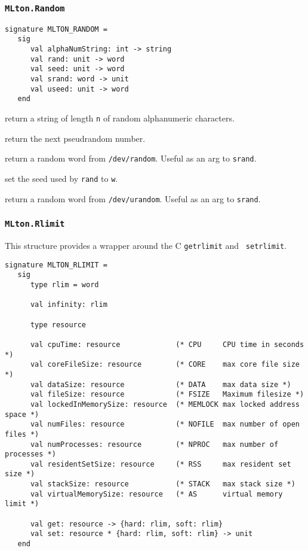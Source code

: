 \subsubsection{\tt MLton.Random}
\begin{verbatim}
signature MLTON_RANDOM =
   sig
      val alphaNumString: int -> string
      val rand: unit -> word
      val seed: unit -> word
      val srand: word -> unit
      val useed: unit -> word
   end
\end{verbatim}

\begin{description}
return a string of length {\tt n} of random alphanumeric characters.

return the next pseudrandom number.

return a random word from {\tt /dev/random}.  Useful as an arg to {\tt srand}.

set the seed used by {\tt rand} to {\tt w}.

return a random word from {\tt /dev/urandom}.  Useful as an arg to {\tt srand}.
\end{description}

\subsubsection{\tt MLton.Rlimit}
This structure provides a wrapper around the C {\tt getrlimit} and {\tt
setrlimit}.
\begin{verbatim}
signature MLTON_RLIMIT =
   sig
      type rlim = word
               
      val infinity: rlim

      type resource
               
      val cpuTime: resource             (* CPU     CPU time in seconds *)
      val coreFileSize: resource        (* CORE    max core file size *)
      val dataSize: resource            (* DATA    max data size *)
      val fileSize: resource            (* FSIZE   Maximum filesize *)
      val lockedInMemorySize: resource  (* MEMLOCK max locked address space *)
      val numFiles: resource            (* NOFILE  max number of open files *)  
      val numProcesses: resource        (* NPROC   max number of processes *)
      val residentSetSize: resource     (* RSS     max resident set size *)
      val stackSize: resource           (* STACK   max stack size *)
      val virtualMemorySize: resource   (* AS      virtual memory limit *)
      
      val get: resource -> {hard: rlim, soft: rlim}
      val set: resource * {hard: rlim, soft: rlim} -> unit
   end
\end{verbatim}

